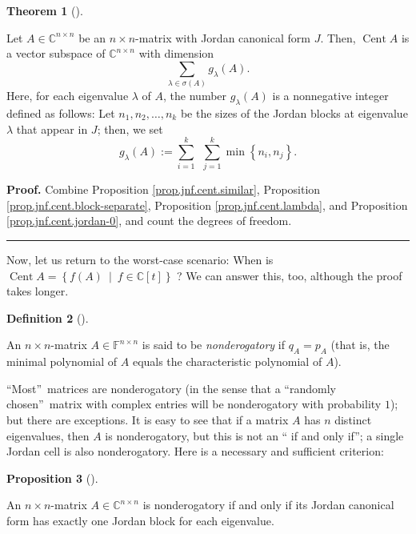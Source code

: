 \documentclass[numbers=enddot,12pt,final,onecolumn,notitlepage]{scrartcl}%
\numberwithin{exer}{subsection}
\theoremstyle{definition}
\newtheorem{theo}{Theorem}[subsection]
\newenvironment{theorem}[1][]
{\begin{theo}[#1]\begin{leftbar}}
{\end{leftbar}\end{theo}}
\newtheorem{prop}[theo]{Proposition}
\newenvironment{proposition}[1][]
{\begin{prop}[#1]\begin{leftbar}}
{\end{leftbar}\end{prop}}
\newtheorem{defi}[theo]{Definition}
\newenvironment{definition}[1][]
{\begin{defi}[#1]\begin{leftbar}}
{\end{leftbar}\end{defi}}
\newenvironment{proof}[1][Proof]{\noindent\textbf{#1.} }{\ \rule{0.5em}{0.5em}}
\let\sumnonlimits\sum
\renewcommand{\sum}{\sumnonlimits\limits}
\begin{document}
\begin{theorem}
Let $A\in\mathbb{C}^{n\times n}$ be an $n\times n$-matrix with Jordan
canonical form $J$. Then, $\operatorname*{Cent}A$ is a vector subspace of
$\mathbb{C}^{n\times n}$ with dimension%
\[
\sum_{\lambda\in\sigma\left(  A\right)  }g_{\lambda}\left(  A\right)  .
\]
Here, for each eigenvalue $\lambda$ of $A$, the number $g_{\lambda}\left(
A\right)  $ is a nonnegative integer defined as follows: Let $n_{1}%
,n_{2},\ldots,n_{k}$ be the sizes of the Jordan blocks at eigenvalue $\lambda$
that appear in $J$; then, we set%
\[
g_{\lambda}\left(  A\right)  :=\sum_{i=1}^{k}\ \ \sum_{j=1}^{k}\min\left\{
n_{i},n_{j}\right\}  .
\]

\end{theorem}

\begin{proof}
Combine Proposition \ref{prop.jnf.cent.similar}, Proposition
\ref{prop.jnf.cent.block-separate}, Proposition \ref{prop.jnf.cent.lambda},
and Proposition \ref{prop.jnf.cent.jordan-0}, and count the degrees of freedom.
\end{proof}

Now, let us return to the worst-case scenario: When is $\operatorname*{Cent}%
A=\left\{  f\left(  A\right)  \ \mid\ f\in\mathbb{C}\left[  t\right]
\right\}  $ ? We can answer this, too, although the proof takes longer.

\begin{definition}
An $n\times n$-matrix $A\in\mathbb{F}^{n\times n}$ is said to be
\emph{nonderogatory} if $q_{A}=p_{A}$ (that is, the minimal polynomial of $A$
equals the characteristic polynomial of $A$).
\end{definition}

\textquotedblleft Most\textquotedblright\ matrices are nonderogatory (in the
sense that a \textquotedblleft randomly chosen\textquotedblright\ matrix with
complex entries will be nonderogatory with probability $1$); but there are
exceptions. It is easy to see that if a matrix $A$ has $n$ distinct
eigenvalues, then $A$ is nonderogatory, but this is not an \textquotedblleft
if and only if\textquotedblright; a single Jordan cell is also nonderogatory.
Here is a necessary and sufficient criterion:

\begin{proposition}
An $n\times n$-matrix $A\in\mathbb{C}^{n\times n}$ is nonderogatory if and
only if its Jordan canonical form has exactly one Jordan block for each eigenvalue.
\end{proposition}
\end{document}
